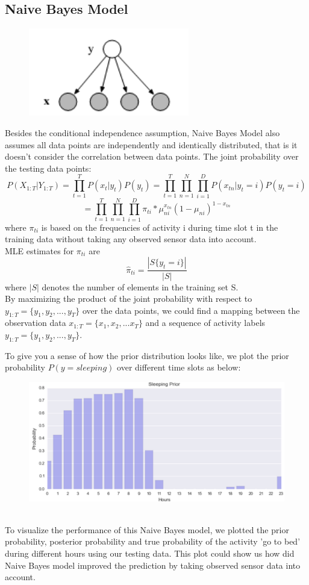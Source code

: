 \documentclass[10pt,letter]{article}
\numberwithin{equation}{section} %
\numberwithin{figure}{section} %
\numberwithin{table}{section} %
\begin{document}
\subsection{Naive Bayes Model}
\begin{figure}[h]
    \centering
\includegraphics[width=7cm]{NB}
\end{figure}
Besides the conditional independence assumption, Naive Bayes Model also assumes all data points are independently and identically distributed, that is it doesn't consider the correlation between data points. 
The joint probability over the testing data points:
$$P(X_{1:T}|Y_{1:T})= \prod_{t=1}^T P(x_t|y_t)P(y_t)= \prod_{t=1}^T\prod_{n=1}^N\prod_{i=1}^D P(x_{tn}|y_t = i)P(y_t=i)$$
$$ = \prod_{t=1}^T\prod_{n=1}^N\prod_{i=1}^D  \pi_{ti}*\mu_{ni}^{x_{tn}}(1-\mu_{ni})^{1-x_{tn}}$$
where $\pi_{ti}$ is based on the frequencies of activity i during time slot t in the training data without taking any observed sensor data into account. \\
MLE estimates for $\pi_{ti}$ are
$$\hat{\pi}_{ti} = \frac{|S\{y_t=i\}|} {|S|}$$
where $|S|$ denotes the number of elements in the training set S.\\
By maximizing the product of the joint probability with respect to $y_{1:T} = \{y_1,y_2,...,y_T\}$ over the data points, we could find a mapping between the observation data $x_{1:T} = \{x_1,x_2,...x_T\}$ and a sequence of activity labels $y_{1:T} = \{y_1,y_2,...,y_T\}$.

To give you a sense of how the prior distribution looks like, we plot the prior probability $P(y= sleeping)$ over different time slots as below: \\
\begin{figure}[h]
    \centering
    \includegraphics[width=18cm]{sleeping_prior}
\end{figure}\\
To visualize the performance of this Naive Bayes model, we plotted the prior probability, posterior probability and true probability of the activity 'go to bed' during different hours using our testing data. This plot could show us how did Naive Bayes model improved the prediction by taking observed sensor data into account.
\end{document}
